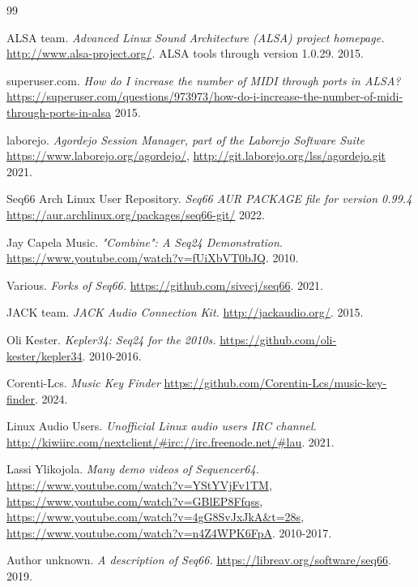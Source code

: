 {\RaggedRight
\begin{thebibliography}{99}

   ALSA team.
   \emph{Advanced Linux Sound Architecture (ALSA) project homepage.}
   \url{http://www.alsa-project.org/}.
   ALSA tools through version 1.0.29.
   2015.

   superuser.com.
   \emph{How do I increase the number of MIDI through ports in ALSA?}
   \url{https://superuser.com/questions/973973/how-do-i-increase-the-number-of-midi-through-ports-in-alsa}
   2015.

   laborejo.
   \emph{Agordejo Session Manager, part of the Laborejo Software Suite}
   \url{https://www.laborejo.org/agordejo/},
   \url{http://git.laborejo.org/lss/agordejo.git}
   2021.

   Seq66 Arch Linux User Repository.
   \emph{Seq66 AUR PACKAGE file for version 0.99.4}
   \url{https://aur.archlinux.org/packages/seq66-git/}
   2022.

   Jay Capela Music.
   \emph{"Combine": A Seq24 Demonstration.}
   \url{https://www.youtube.com/watch?v=fUiXbVT0bJQ}.
   2010.

   Various.
   \emph{Forks of Seq66.}
   \url{https://github.com/sivecj/seq66}.
   2021.

   JACK team.
   \emph{JACK Audio Connection Kit.}
   \url{http://jackaudio.org/}.
   2015.

   Oli Kester.
   \emph{Kepler34: Seq24 for the 2010s.}
   \url{https://github.com/oli-kester/kepler34}.
   2010-2016.

   Corenti-Lcs.
   \emph{Music Key Finder}
   \url{https://github.com/Corentin-Lcs/music-key-finder}.
   2024.

   Linux Audio Users.
   \emph{Unofficial Linux audio users IRC channel.}
   \url{http://kiwiirc.com/nextclient/#irc://irc.freenode.net/#lau}.
   2021.

   Lassi Ylikojola.
   \emph{Many demo videos of Sequencer64.}
   \url{https://www.youtube.com/watch?v=YStYVjFv1TM},
   \url{https://www.youtube.com/watch?v=GBlEP8Ffqss},
   \url{https://www.youtube.com/watch?v=4gG8SvJxJkA&t=28s},
   \url{https://www.youtube.com/watch?v=n4Z4WPK6FpA}.
   2010-2017.

   Author unknown.
   \emph{A description of Seq66.}
   \url{https://libreav.org/software/seq66}.
   2019.


\end{thebibliography}}
